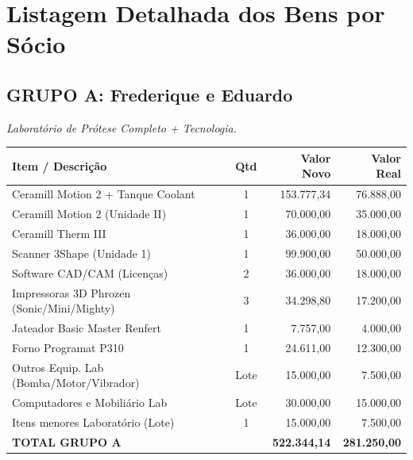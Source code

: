 \documentclass[12pt, a4paper]{article}
\begin{document}
\newpage
\section{Listagem Detalhada dos Bens por Sócio}

\subsection*{GRUPO A: Frederique e Eduardo}
\textit{Laboratório de Prótese Completo + Tecnologia.}
\begin{longtable}{>{\raggedright\arraybackslash}p{8cm} c r r}
    \toprule
    \rowcolor{tableHeader} \textbf{Item / Descrição} & \textbf{Qtd} & \textbf{Valor Novo} & \textbf{Valor Real} \\
    \midrule
    \endhead
    Ceramill Motion 2 + Tanque Coolant & 1 & 153.777,34 & 76.888,00 \\
    Ceramill Motion 2 (Unidade II) & 1 & 70.000,00 & 35.000,00 \\
    Ceramill Therm III & 1 & 36.000,00 & 18.000,00 \\
    Scanner 3Shape (Unidade 1) & 1 & 99.900,00 & 50.000,00 \\
    Software CAD/CAM (Licenças) & 2 & 36.000,00 & 18.000,00 \\
    Impressoras 3D Phrozen (Sonic/Mini/Mighty) & 3 & 34.298,80 & 17.200,00 \\
    Jateador Basic Master Renfert & 1 & 7.757,00 & 4.000,00 \\
    Forno Programat P310 & 1 & 24.611,00 & 12.300,00 \\
    Outros Equip. Lab (Bomba/Motor/Vibrador) & Lote & 15.000,00 & 7.500,00 \\
    Computadores e Mobiliário Lab & Lote & 30.000,00 & 15.000,00 \\
    Itens menores Laboratório (Lote) & 1 & 15.000,00 & 7.500,00 \\
    \midrule
    \rowcolor{lightGray} \textbf{TOTAL GRUPO A} & & \textbf{522.344,14} & \textbf{281.250,00} \\
    \bottomrule
\end{longtable}

\end{document}

